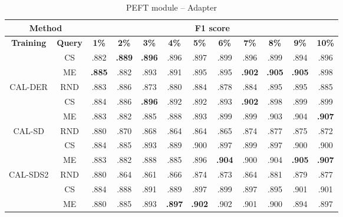 \begin{table}[htbp]
\centering
\begin{subtable}{\linewidth}
\centering
\caption{PEFT module -- Adapter}

\begin{tabular}{c|c|cccccccccc}
\toprule
\multicolumn{2}{c|}{\textbf{Method}} & \multicolumn{10}{c}{\textbf{F1 score}} \\
\midrule
\textbf{Training} & \textbf{Query} & \textbf{1\%} & \textbf{2\%} & \textbf{3\%} & \textbf{4\%} & \textbf{5\%} & \textbf{6\%} & \textbf{7\%} & \textbf{8\%} & \textbf{9\%} & \textbf{10\%}\\
\midrule
 & CS & .882 & \textbf{.889} & \textbf{.896} & .896 & .897 & .899 & .896 & .899 & .894 & .896\\

 & ME & \textbf{.885} & .882 & .893 & .891 & .895 & .895 & \textbf{.902} & \textbf{.905} & \textbf{.905} & .898\\

\multirow{-3}{*}{\raggedright\arraybackslash CAL-DER} & RND & .883 & .886 & .873 & .880 & .884 & .878 & .884 & .895 & .895 & .885\\
\midrule
 & CS & .884 & .886 & \textbf{.896} & .892 & .892 & .893 & \textbf{.902} & .898 & .899 & .899\\

 & ME & .883 & .882 & .885 & .888 & .893 & .899 & .899 & .903 & .904 & \textbf{.907}\\

\multirow{-3}{*}{\raggedright\arraybackslash CAL-SD} & RND & .880 & .870 & .868 & .864 & .864 & .865 & .874 & .877 & .875 & .872\\
\midrule
 & CS & .884 & .885 & .893 & .889 & .900 & .897 & .899 & .897 & .900 & .900\\

 & ME & .883 & .882 & .888 & .885 & .896 & \textbf{.904} & .900 & .904 & \textbf{.905} & \textbf{.907}\\

\multirow{-3}{*}{\raggedright\arraybackslash CAL-SDS2} & RND & .880 & .864 & .861 & .866 & .874 & .873 & .864 & .881 & .879 & .877\\
\midrule
 & CS & .884 & .888 & .891 & .889 & .897 & .899 & .897 & .895 & .901 & .901\\

 & ME & .880 & .885 & .893 & \textbf{.897} & \textbf{.902} & .902 & .901 & .900 & .894 & .897\\


\end{tabular}
\end{subtable}
\end{table}
